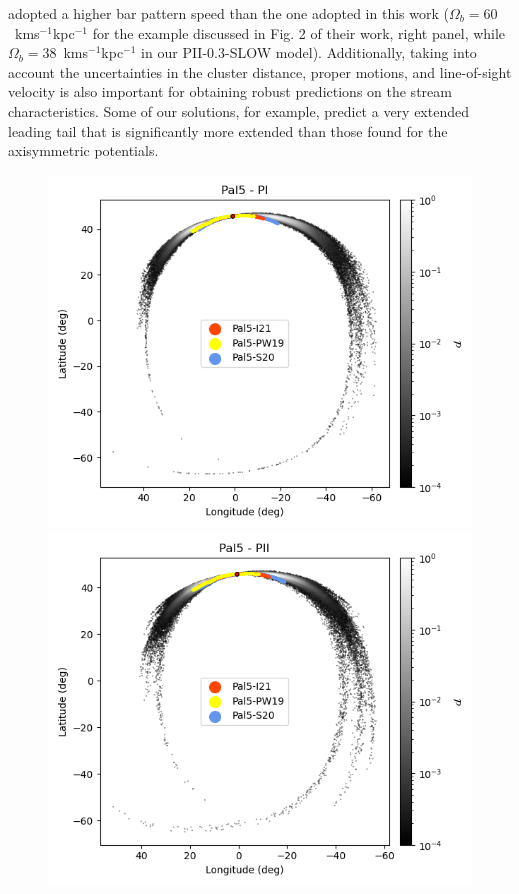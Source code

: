 adopted a higher bar pattern speed than the one adopted in this work ($\Omega_b=60$~kms$^{-1}$kpc$^{-1}$ for the example discussed in Fig. 2 of their work, right panel, while $\Omega_b=38$~kms$^{-1}$kpc$^{-1}$ in our PII-0.3-SLOW model). Additionally, taking into account the uncertainties in the cluster distance, proper motions, and line-of-sight velocity is also important for obtaining robust predictions on the stream characteristics. Some of our solutions, for example, predict a very extended leading tail that is significantly more extended than those found for the axisymmetric potentials.

            \twocolumn
            \begin{figure}[h!]
                \begin{center}
                    \includegraphics[clip=true, trim = 0mm 0mm 0mm 0mm, width=0.65\columnwidth]{images/PI_individual_Pal5_galstream-Pal5-l-b.png}
                    \includegraphics[clip=true, trim = 0mm 0mm 0mm 0mm, width=0.65\columnwidth]{images/PII_individual_Pal5_galstream-Pal5-l-b.png}

\end{center}
\end{figure}
